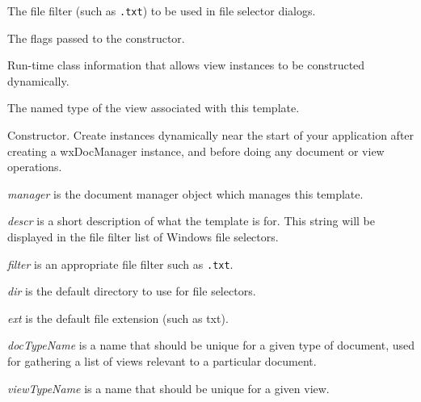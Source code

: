 
The file filter (such as {\tt *.txt}) to be used in file selector dialogs.



The flags passed to the constructor.



Run-time class information that allows view instances to be constructed dynamically.



The named type of the view associated with this template.



Constructor. Create instances dynamically near the start of your application after creating
a wxDocManager instance, and before doing any document or view operations.

{\it manager} is the document manager object which manages this template.

{\it descr} is a short description of what the template is for. This string will be displayed in the
file filter list of Windows file selectors.

{\it filter} is an appropriate file filter such as {\tt *.txt}.

{\it dir} is the default directory to use for file selectors.

{\it ext} is the default file extension (such as txt).

{\it docTypeName} is a name that should be unique for a given type of document, used for
gathering a list of views relevant to a particular document.

{\it viewTypeName} is a name that should be unique for a given view.

